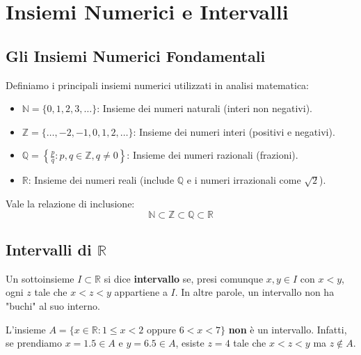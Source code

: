 \section{Insiemi Numerici e Intervalli}

\subsection{Gli Insiemi Numerici Fondamentali}
Definiamo i principali insiemi numerici utilizzati in analisi matematica: %

\begin{itemize}
    \item $\mathbb{N} = \{0, 1, 2, 3, \dots\}$: Insieme dei numeri naturali (interi non negativi). %
    \item $\mathbb{Z} = \{ \dots, -2, -1, 0, 1, 2, \dots\}$: Insieme dei numeri interi (positivi e negativi). %
    \item $\mathbb{Q} = \left\{ \frac{p}{q} : p, q \in \mathbb{Z}, q \neq 0 \right\}$: Insieme dei numeri razionali (frazioni). %
    \item $\mathbb{R}$: Insieme dei numeri reali (include $\mathbb{Q}$ e i numeri irrazionali come $\sqrt{2}$). %
\end{itemize}

Vale la relazione di inclusione: 
$$ \mathbb{N} \subset \mathbb{Z} \subset \mathbb{Q} \subset \mathbb{R} $$

\subsection{Intervalli di $\mathbb{R}$}
\begin{definition}[Intervallo]
    Un sottoinsieme $I \subset \mathbb{R}$ si dice \textbf{intervallo} se, presi comunque $x, y \in I$ con $x < y$, ogni $z$ tale che $x < z < y$ appartiene a $I$. 
    In altre parole, un intervallo non ha "buchi" al suo interno. 
\end{definition}

\begin{example}
    L'insieme $A = \{x \in \mathbb{R} : 1 \le x < 2 \text{ oppure } 6 < x < 7 \}$ \textbf{non} è un intervallo. Infatti, se prendiamo $x = 1.5 \in A$ e $y = 6.5 \in A$, esiste $z=4$ tale che $x < z < y$ ma $z \notin A$. 
\end{example}

